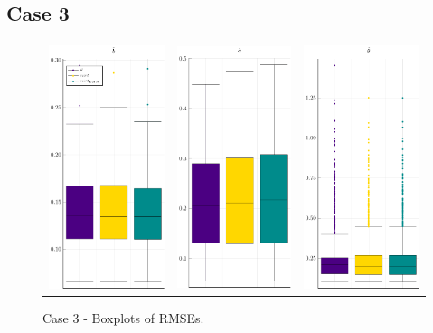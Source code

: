\subsection{Case 3}
\begin{figure}[H] 
	
	\centering
	\begin{tabular}[b]{c c c}
		\includegraphics[width=.30\textwidth]{Figures/3/RMSE_b.pdf} & \includegraphics[width=.3\textwidth]{Figures/3/RMSE_a.pdf} & \includegraphics[width=.3\textwidth]{Figures/3/RMSE_t.pdf}
	\end{tabular}
	\caption{Case 3 - Boxplots of RMSEs.}
	\label{fig:bpRMSE3}
\end{figure}
